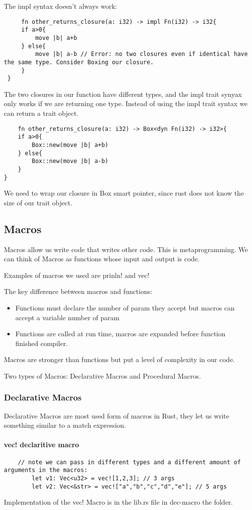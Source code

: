 The impl syntax doesn't always work:\begin{lstlisting}
     fn other_returns_closure(a: i32) -> impl Fn(i32) -> i32{
     if a>0{
         move |b| a+b
     } else{
         move |b| a-b // Error: no two closures even if identical have the same type. Consider Boxing our closure.
     }
 }
\end{lstlisting}
The two closures in our function have different types, and the impl trait synyax only works if we are returning one type. Instead of using the impl trait syntax we can return a trait object. 

\begin{lstlisting}
    fn other_returns_closure(a: i32) -> Box<dyn Fn(i32) -> i32>{
    if a>0{
        Box::new(move |b| a+b)
    } else{
        Box::new(move |b| a-b) 
    }
}
\end{lstlisting}
We need to wrap our closure in Box smart pointer, since rust does not know the size of our trait object.

\subsection{Macros}
Macros allow us write code that writes other code. This is metaprogramming. We can think of Macros as functions whose input and output is code.

Examples of macros we used are prinln! and vec!

The key difference between macros and functions:\begin{itemize}
    \item Functions must declare the number of param they accept but macros can accept a variable number of param
    \item Functions are called at run time, macros are expanded before function finished compiler. 
\end{itemize}
Macros are stronger than functions but put a level of complexity in our code.

Two types of Macros: Declarative Macros and Procedural Macros.
\subsubsection{Declarative Macros}
Declarative Macros are most used form of macros in Rust, they let us write something similar to a match expression. 

\paragraph*{vec! declaritive macro}\begin{lstlisting}
    // note we can pass in different types and a different amount of arguments in the macros:
        let v1: Vec<u32> = vec![1,2,3]; // 3 args
        let v2: Vec<&str> = vec!["a","b","c","d","e"]; // 5 args
\end{lstlisting}
Implementation of the vec! Macro is in the lib.rs file in dec-macro the folder. 
